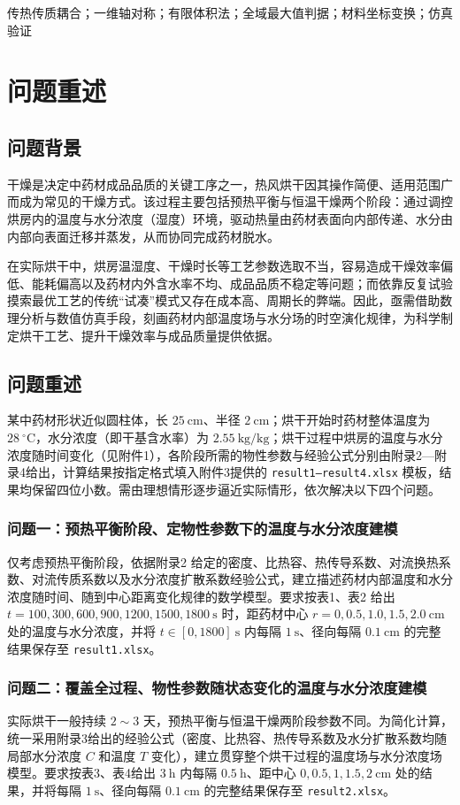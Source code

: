 \documentclass[12pt,a4paper]{article}
\begin{document}
 传热传质耦合；一维轴对称；有限体积法；全域最大值判据；材料坐标变换；仿真验证

\clearpage

\section{问题重述}
\subsection{问题背景}
干燥是决定中药材成品品质的关键工序之一，热风烘干因其操作简便、适用范围广而成为常见的干燥方式。该过程主要包括预热平衡与恒温干燥两个阶段：通过调控烘房内的温度与水分浓度（湿度）环境，驱动热量由药材表面向内部传递、水分由内部向表面迁移并蒸发，从而协同完成药材脱水。

在实际烘干中，烘房温湿度、干燥时长等工艺参数选取不当，容易造成干燥效率偏低、能耗偏高以及药材内外含水率不均、成品品质不稳定等问题；而依靠反复试验摸索最优工艺的传统“试凑”模式又存在成本高、周期长的弊端。因此，亟需借助数理分析与数值仿真手段，刻画药材内部温度场与水分场的时空演化规律，为科学制定烘干工艺、提升干燥效率与成品质量提供依据。

\subsection{问题重述}
某中药材形状近似圆柱体，长 $25\ \mathrm{cm}$、半径 $2\ \mathrm{cm}$；烘干开始时药材整体温度为 $28\ \mathrm{^{\circ}C}$，水分浓度（即干基含水率）为 $2.55\ \mathrm{kg/kg}$；烘干过程中烘房的温度与水分浓度随时间变化（见附件1），各阶段所需的物性参数与经验公式分别由附录2—附录4给出，计算结果按指定格式填入附件3提供的 \texttt{result1—result4.xlsx} 模板，结果均保留四位小数。需由理想情形逐步逼近实际情形，依次解决以下四个问题。

\subsubsection{问题一：预热平衡阶段、定物性参数下的温度与水分浓度建模}
仅考虑预热平衡阶段，依据附录2 给定的密度、比热容、热传导系数、对流换热系数、对流传质系数以及水分浓度扩散系数经验公式，建立描述药材内部温度和水分浓度随时间、随到中心距离变化规律的数学模型。要求按表1、表2 给出 $t=100,300,600,900,1200,1500,1800~\mathrm{s}$ 时，距药材中心 $r=0,0.5,1.0,1.5,2.0~\mathrm{cm}$ 处的温度与水分浓度，并将 $t\in[0,1800]~\mathrm{s}$ 内每隔 $1~\mathrm{s}$、径向每隔 $0.1~\mathrm{cm}$ 的完整结果保存至 \texttt{result1.xlsx}。
\subsubsection{问题二：覆盖全过程、物性参数随状态变化的温度与水分浓度建模}
实际烘干一般持续 $2\sim3$ 天，预热平衡与恒温干燥两阶段参数不同。为简化计算，统一采用附录3给出的经验公式（密度、比热容、热传导系数及水分扩散系数均随局部水分浓度 $C$ 和温度 $T$ 变化），建立贯穿整个烘干过程的温度场与水分浓度场模型。要求按表3、表4给出 $3\ \mathrm{h}$ 内每隔 $0.5\ \mathrm{h}$、距中心 $0, 0.5, 1, 1.5, 2\ \mathrm{cm}$ 处的结果，并将每隔 $1\ \mathrm{s}$、径向每隔 $0.1\ \mathrm{cm}$ 的完整结果保存至 \texttt{result2.xlsx}。
\end{document}
